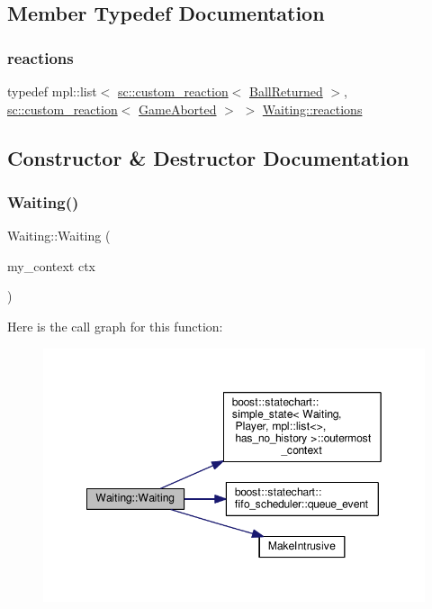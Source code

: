 \subsection{Member Typedef Documentation}
\mbox{\label{struct_waiting_a81771f42c7fd4098798766c8586bd164}} 
\subsubsection{\texorpdfstring{reactions}{reactions}}
{\footnotesize\ttfamily typedef mpl\+::list$<$ \mbox{\hyperlink{classboost_1_1statechart_1_1custom__reaction}{sc\+::custom\+\_\+reaction}}$<$ \mbox{\hyperlink{struct_ball_returned}{Ball\+Returned}} $>$, \mbox{\hyperlink{classboost_1_1statechart_1_1custom__reaction}{sc\+::custom\+\_\+reaction}}$<$ \mbox{\hyperlink{struct_game_aborted}{Game\+Aborted}} $>$ $>$ \mbox{\hyperlink{struct_waiting_a81771f42c7fd4098798766c8586bd164}{Waiting\+::reactions}}}



\subsection{Constructor \& Destructor Documentation}
\mbox{\label{struct_waiting_a0c0fb756d46782ff26b8faa3ce80defc}} 
\subsubsection{\texorpdfstring{Waiting()}{Waiting()}}
{\footnotesize\ttfamily Waiting\+::\+Waiting (\begin{DoxyParamCaption}\item[{my\+\_\+context}]{ctx }\end{DoxyParamCaption})\hspace{0.3cm}{\ttfamily [inline]}}

Here is the call graph for this function\+:
\nopagebreak
\begin{figure}[H]
\begin{center}
\leavevmode
\includegraphics[width=349pt]{struct_waiting_a0c0fb756d46782ff26b8faa3ce80defc_cgraph}
\end{center}
\end{figure}


